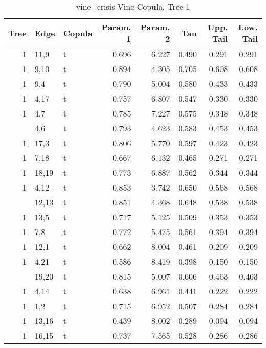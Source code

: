 \begin{table}

\caption{vine_crisis Vine Copula, Tree 1}
\centering
\begin{tabular}[t]{rllrrrrr}
\toprule
Tree & Edge & Copula & Param. 1 & Param. 2 & Tau & Upp. Tail & Low. Tail\\
\midrule
1 & 11,9 & t & 0.696 & 6.227 & 0.490 & 0.291 & 0.291\\
1 & 9,10 & t & 0.894 & 4.305 & 0.705 & 0.608 & 0.608\\
1 & 9,4 & t & 0.790 & 5.004 & 0.580 & 0.433 & 0.433\\
1 & 4,17 & t & 0.757 & 6.807 & 0.547 & 0.330 & 0.330\\
1 & 4,7 & t & 0.785 & 7.227 & 0.575 & 0.348 & 0.348\\
\addlinespace
1 & 4,6 & t & 0.793 & 4.623 & 0.583 & 0.453 & 0.453\\
1 & 17,3 & t & 0.806 & 5.770 & 0.597 & 0.423 & 0.423\\
1 & 7,18 & t & 0.667 & 6.132 & 0.465 & 0.271 & 0.271\\
1 & 18,19 & t & 0.773 & 6.887 & 0.562 & 0.344 & 0.344\\
1 & 4,12 & t & 0.853 & 3.742 & 0.650 & 0.568 & 0.568\\
\addlinespace
1 & 12,13 & t & 0.851 & 4.368 & 0.648 & 0.538 & 0.538\\
1 & 13,5 & t & 0.717 & 5.125 & 0.509 & 0.353 & 0.353\\
1 & 7,8 & t & 0.772 & 5.475 & 0.561 & 0.394 & 0.394\\
1 & 12,1 & t & 0.662 & 8.004 & 0.461 & 0.209 & 0.209\\
1 & 4,21 & t & 0.586 & 8.419 & 0.398 & 0.150 & 0.150\\
\addlinespace
1 & 19,20 & t & 0.815 & 5.007 & 0.606 & 0.463 & 0.463\\
1 & 4,14 & t & 0.638 & 6.961 & 0.441 & 0.222 & 0.222\\
1 & 1,2 & t & 0.715 & 6.952 & 0.507 & 0.284 & 0.284\\
1 & 13,16 & t & 0.439 & 8.002 & 0.289 & 0.094 & 0.094\\
1 & 16,15 & t & 0.737 & 7.565 & 0.528 & 0.286 & 0.286\\
\bottomrule
\end{tabular}
\end{table}
